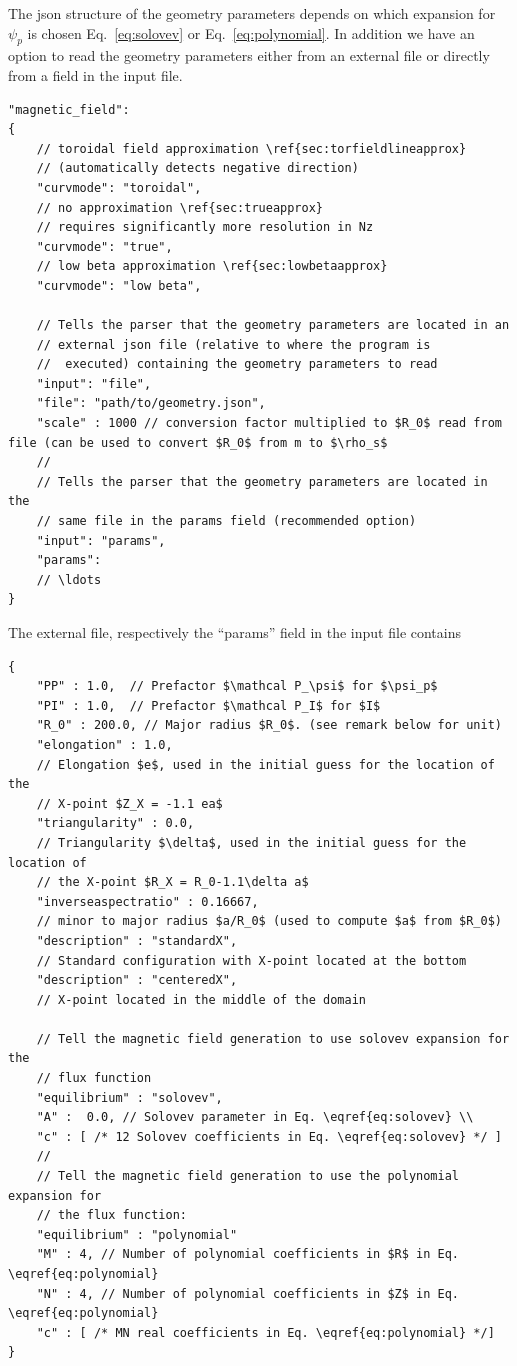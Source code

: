 The json structure of the geometry parameters depends on which expansion for $\psi_p$ is chosen Eq.~\eqref{eq:solovev} or Eq.~\eqref{eq:polynomial}.
In addition we have an option to read the geometry parameters either from an external
file or directly from a field in the input file.
\begin{verbatim}
"magnetic_field":
{
    // toroidal field approximation \ref{sec:torfieldlineapprox}
    // (automatically detects negative direction)
    "curvmode": "toroidal",
    // no approximation \ref{sec:trueapprox}
    // requires significantly more resolution in Nz
    "curvmode": "true",
    // low beta approximation \ref{sec:lowbetaapprox}
    "curvmode": "low beta",

    // Tells the parser that the geometry parameters are located in an
    // external json file (relative to where the program is
    //  executed) containing the geometry parameters to read
    "input": "file",
    "file": "path/to/geometry.json",
    "scale" : 1000 // conversion factor multiplied to $R_0$ read from file (can be used to convert $R_0$ from m to $\rho_s$
    //
    // Tells the parser that the geometry parameters are located in the
    // same file in the params field (recommended option)
    "input": "params",
    "params":
    // \ldots
}
\end{verbatim}
\noindent
The external file, respectively the ``params'' field in the input file
contains
\begin{verbatim}
{
    "PP" : 1.0,  // Prefactor $\mathcal P_\psi$ for $\psi_p$
    "PI" : 1.0,  // Prefactor $\mathcal P_I$ for $I$
    "R_0" : 200.0, // Major radius $R_0$. (see remark below for unit)
    "elongation" : 1.0,
    // Elongation $e$, used in the initial guess for the location of the
    // X-point $Z_X = -1.1 ea$
    "triangularity" : 0.0,
    // Triangularity $\delta$, used in the initial guess for the location of
    // the X-point $R_X = R_0-1.1\delta a$
    "inverseaspectratio" : 0.16667,
    // minor to major radius $a/R_0$ (used to compute $a$ from $R_0$)
    "description" : "standardX",
    // Standard configuration with X-point located at the bottom
    "description" : "centeredX",
    // X-point located in the middle of the domain

    // Tell the magnetic field generation to use solovev expansion for the
    // flux function
    "equilibrium" : "solovev",
    "A" :  0.0, // Solovev parameter in Eq. \eqref{eq:solovev} \\
    "c" : [ /* 12 Solovev coefficients in Eq. \eqref{eq:solovev} */ ]
    //
    // Tell the magnetic field generation to use the polynomial expansion for
    // the flux function:
    "equilibrium" : "polynomial"
    "M" : 4, // Number of polynomial coefficients in $R$ in Eq. \eqref{eq:polynomial}
    "N" : 4, // Number of polynomial coefficients in $Z$ in Eq. \eqref{eq:polynomial}
    "c" : [ /* MN real coefficients in Eq. \eqref{eq:polynomial} */]
}
\end{verbatim}
